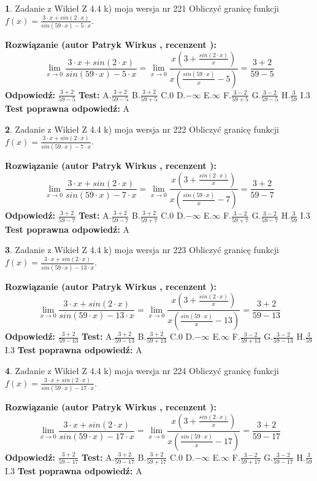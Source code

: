 \documentclass[12pt, a4paper]{article}
\theoremstyle{definition} %
\newtheorem{zad}{}
\newcommand{\zadStart}[1]{\begin{zad}#1\newline}
\newcommand{\zadStop}{\end{zad}}
\newcommand{\rozwStart}[2]{\noindent \textbf{Rozwiązanie (autor #1 , recenzent #2): }\newline}
\newcommand{\rozwStop}{\newline}
\newcommand{\odpStart}{\noindent \textbf{Odpowiedź:}\newline}
\newcommand{\odpStop}{\newline}
\newcommand{\testStart}{\noindent \textbf{Test:}\newline}
\newcommand{\testStop}{\newline}
\newcommand{\kluczStart}{\noindent \textbf{Test poprawna odpowiedź:}\newline}
\newcommand{\kluczStop}{\newline}
\begin{document}
\zadStart{Zadanie z Wikieł Z 4.4 k) moja wersja nr 221}
Obliczyć granicę funkcji $f(x)=\frac{3\cdot x +sin(2\cdot x)}{sin(59\cdot x) -5\cdot x}$.
\zadStop
\rozwStart{Patryk Wirkus}{}
$$\lim\limits_{x\to 0}\frac{3\cdot x +sin(2\cdot x)}{sin(59\cdot x) -5\cdot x}
=\lim\limits_{x\to 0}\frac{x(3+\frac{sin(2\cdot x)}{x})}{x(\frac{sin(59\cdot x)}{x}-5)}
=\frac{3+2}{59-5}$$
\rozwStop
\odpStart
$\frac{3+2}{59-5}$
\odpStop
\testStart
A.$\frac{3+2}{59-5}$
B.$\frac{3+2}{59+5}$
C.$0$
D.$-\infty$
E.$\infty$
F.$\frac{3-2}{59+5}$
G.$\frac{3-2}{59-5}$
H.$\frac{3}{59}$
I.$3$
\testStop
\kluczStart
A
\kluczStop



\zadStart{Zadanie z Wikieł Z 4.4 k) moja wersja nr 222}
Obliczyć granicę funkcji $f(x)=\frac{3\cdot x +sin(2\cdot x)}{sin(59\cdot x) -7\cdot x}$.
\zadStop
\rozwStart{Patryk Wirkus}{}
$$\lim\limits_{x\to 0}\frac{3\cdot x +sin(2\cdot x)}{sin(59\cdot x) -7\cdot x}
=\lim\limits_{x\to 0}\frac{x(3+\frac{sin(2\cdot x)}{x})}{x(\frac{sin(59\cdot x)}{x}-7)}
=\frac{3+2}{59-7}$$
\rozwStop
\odpStart
$\frac{3+2}{59-7}$
\odpStop
\testStart
A.$\frac{3+2}{59-7}$
B.$\frac{3+2}{59+7}$
C.$0$
D.$-\infty$
E.$\infty$
F.$\frac{3-2}{59+7}$
G.$\frac{3-2}{59-7}$
H.$\frac{3}{59}$
I.$3$
\testStop
\kluczStart
A
\kluczStop



\zadStart{Zadanie z Wikieł Z 4.4 k) moja wersja nr 223}
Obliczyć granicę funkcji $f(x)=\frac{3\cdot x +sin(2\cdot x)}{sin(59\cdot x) -13\cdot x}$.
\zadStop
\rozwStart{Patryk Wirkus}{}
$$\lim\limits_{x\to 0}\frac{3\cdot x +sin(2\cdot x)}{sin(59\cdot x) -13\cdot x}
=\lim\limits_{x\to 0}\frac{x(3+\frac{sin(2\cdot x)}{x})}{x(\frac{sin(59\cdot x)}{x}-13)}
=\frac{3+2}{59-13}$$
\rozwStop
\odpStart
$\frac{3+2}{59-13}$
\odpStop
\testStart
A.$\frac{3+2}{59-13}$
B.$\frac{3+2}{59+13}$
C.$0$
D.$-\infty$
E.$\infty$
F.$\frac{3-2}{59+13}$
G.$\frac{3-2}{59-13}$
H.$\frac{3}{59}$
I.$3$
\testStop
\kluczStart
A
\kluczStop



\zadStart{Zadanie z Wikieł Z 4.4 k) moja wersja nr 224}
Obliczyć granicę funkcji $f(x)=\frac{3\cdot x +sin(2\cdot x)}{sin(59\cdot x) -17\cdot x}$.
\zadStop
\rozwStart{Patryk Wirkus}{}
$$\lim\limits_{x\to 0}\frac{3\cdot x +sin(2\cdot x)}{sin(59\cdot x) -17\cdot x}
=\lim\limits_{x\to 0}\frac{x(3+\frac{sin(2\cdot x)}{x})}{x(\frac{sin(59\cdot x)}{x}-17)}
=\frac{3+2}{59-17}$$
\rozwStop
\odpStart
$\frac{3+2}{59-17}$
\odpStop
\testStart
A.$\frac{3+2}{59-17}$
B.$\frac{3+2}{59+17}$
C.$0$
D.$-\infty$
E.$\infty$
F.$\frac{3-2}{59+17}$
G.$\frac{3-2}{59-17}$
H.$\frac{3}{59}$
I.$3$
\testStop
\kluczStart
A
\kluczStop
\end{document}
